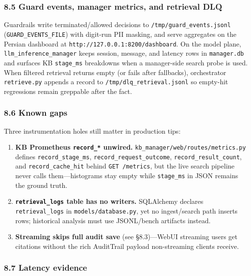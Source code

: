 \documentclass[
  11pt,
]{article}
\providecommand{\tightlist}{%
  \setlength{\itemsep}{0pt}\setlength{\parskip}{0pt}}
\begin{document}
\subsubsection{8.5 Guard events, manager metrics, and retrieval
DLQ}\label{guard-events-manager-metrics-and-retrieval-dlq}

Guardrails write terminated/allowed decisions to
\texttt{/tmp/guard\_events.jsonl} (\texttt{GUARD\_EVENTS\_FILE}) with
digit-run PII masking, and serve aggregates on the Persian dashboard at
\texttt{http://127.0.0.1:8200/dashboard}. On the model plane,
\texttt{llm\_inference\_manager} keeps session, message, and latency
rows in \texttt{manager.db} and surfaces KB \texttt{stage\_ms}
breakdowns when a manager-side search probe is used. When filtered
retrieval returns empty (or fails after fallbacks), orchestrator
\texttt{retrieve.py} appends a record to
\texttt{/tmp/dlq\_retrieval.jsonl} so empty-hit regressions remain
greppable after the fact.

\subsubsection{8.6 Known gaps}\label{known-gaps-1}

Three instrumentation holes still matter in production tips:

\begin{enumerate}
\def\labelenumi{\arabic{enumi}.}
\tightlist
\item
  \textbf{KB Prometheus \texttt{record\_*} unwired.}
  \texttt{kb\_manager/web/routes/metrics.py} defines
  \texttt{record\_stage\_ms}, \texttt{record\_request\_outcome},
  \texttt{record\_result\_count}, and \texttt{record\_cache\_hit} behind
  \texttt{GET\ /metrics}, but the live search pipeline never calls
  them---histograms stay empty while \texttt{stage\_ms} in JSON remains
  the ground truth.
\item
  \textbf{\texttt{retrieval\_logs} table has no writers.} SQLAlchemy
  declares \texttt{retrieval\_logs} in \texttt{models/database.py}, yet
  no ingest/search path inserts rows; historical analysis must use
  JSONL/bench artifacts instead.
\item
  \textbf{Streaming skips full audit save} (see §8.3)---WebUI streaming
  users get citations without the rich AuditTrail payload non-streaming
  clients receive.
\end{enumerate}

\subsubsection{8.7 Latency evidence}\label{latency-evidence}
\end{document}
